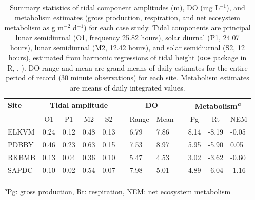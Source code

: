 \documentclass[letterpaper,12pt,oneside]{article}\usepackage[]{graphicx}\usepackage[]{color}
\begin{document}
%
\begin{table}[!tbp]
\caption{Summary statistics of tidal component amplitudes (m), \ac{DO} (mg L$^{-1}$), and metabolism estimates (gross production, respiration, and net ecosystem metabolism as g m$^{-2}$ d$^{-1}$) for each case study.  Tidal components are principal lunar semidiurnal (O1, frequency 25.82 hours), solar diurnal (P1, 24.07 hours), lunar semidiurnal (M2, 12.42 hours), and solar semidiurnal (S2, 12 hours), estimated from harmonic regressions of tidal height (\texttt{oce} package in R, \citealt{Foreman89}, ).  \ac{DO} range and mean are grand means of daily estimates for the entire period of record (30 minute observations) for each site.  Metabolism estimates are means of daily integrated values.\label{tab:case_att}} 
\begin{center}
\begin{tabular}{lllllcllclll}
\hline\hline
\multicolumn{1}{l}{\bfseries Site}&\multicolumn{4}{c}{\bfseries Tidal amplitude}&\multicolumn{1}{c}{\bfseries }&\multicolumn{2}{c}{\bfseries DO}&\multicolumn{1}{c}{\bfseries }&\multicolumn{3}{c}{\bfseries Metabolism\textsuperscript{\textit{a}}}\tabularnewline
\cline{2-5} \cline{7-8} \cline{10-12}
\multicolumn{1}{l}{}&\multicolumn{1}{c}{O1}&\multicolumn{1}{c}{P1}&\multicolumn{1}{c}{M2}&\multicolumn{1}{c}{S2}&\multicolumn{1}{c}{}&\multicolumn{1}{c}{Range}&\multicolumn{1}{c}{Mean}&\multicolumn{1}{c}{}&\multicolumn{1}{c}{Pg}&\multicolumn{1}{c}{Rt}&\multicolumn{1}{c}{NEM}\tabularnewline
\hline
ELKVM&0.24&0.12&0.48&0.13&&6.79&7.86&&8.14&-8.19&-0.05\tabularnewline
PDBBY&0.46&0.23&0.63&0.15&&7.53&8.97&&5.95&-5.90& 0.05\tabularnewline
RKBMB&0.13&0.04&0.36&0.10&&5.47&4.53&&3.02&-3.62&-0.60\tabularnewline
SAPDC&0.10&0.02&0.54&0.07&&7.98&5.01&&4.89&-6.04&-1.16\tabularnewline
\hline
\end{tabular}
\end{center}
\footnotesize\textsuperscript{\textit{a}}Pg: gross production, Rt: respiration, NEM: net ecosystem metabolism\end{table}
\end{document}

